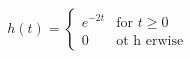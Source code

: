 \documentclass[preview]{standalone}
\begin{document}
\begin{align*}
{ h }(t) = \begin{cases} e^{-2t} & \text{for } t \geq 0 \\ 0 & \text{ot h erwise} \end{cases}
\end{align*}
\end{document}
